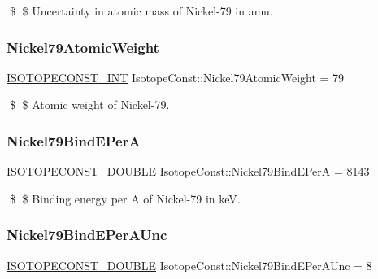 \$ \$ Uncertainty in atomic mass of Nickel-\/79 in amu. \mbox{\label{group___isotope_const-_nickel-_ni79_gaffd59009a8bb9635a787a54baf43958c}} 
\subsubsection{\texorpdfstring{Nickel79\+Atomic\+Weight}{Nickel79AtomicWeight}}
{\footnotesize\ttfamily \mbox{\hyperlink{group___isotope_const-_macros_ga5f18360b3e99483a35c32d789e62621c}{I\+S\+O\+T\+O\+P\+E\+C\+O\+N\+S\+T\+\_\+\+I\+NT}} Isotope\+Const\+::\+Nickel79\+Atomic\+Weight = 79}

\$ \$ Atomic weight of Nickel-\/79. \mbox{\label{group___isotope_const-_nickel-_ni79_ga575853454203d18cdf8e26c928d7b518}} 
\subsubsection{\texorpdfstring{Nickel79\+Bind\+E\+PerA}{Nickel79BindEPerA}}
{\footnotesize\ttfamily \mbox{\hyperlink{group___isotope_const-_macros_ga8f45a7272ce02c0b4c65c44636ed719a}{I\+S\+O\+T\+O\+P\+E\+C\+O\+N\+S\+T\+\_\+\+D\+O\+U\+B\+LE}} Isotope\+Const\+::\+Nickel79\+Bind\+E\+PerA = 8143}

\$ \$ Binding energy per A of Nickel-\/79 in keV. \mbox{\label{group___isotope_const-_nickel-_ni79_gacf23eacd400ea68a9024de42a3689615}} 
\subsubsection{\texorpdfstring{Nickel79\+Bind\+E\+Per\+A\+Unc}{Nickel79BindEPerAUnc}}
{\footnotesize\ttfamily \mbox{\hyperlink{group___isotope_const-_macros_ga8f45a7272ce02c0b4c65c44636ed719a}{I\+S\+O\+T\+O\+P\+E\+C\+O\+N\+S\+T\+\_\+\+D\+O\+U\+B\+LE}} Isotope\+Const\+::\+Nickel79\+Bind\+E\+Per\+A\+Unc = 8}

